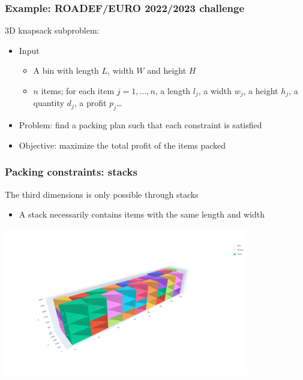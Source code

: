 \documentclass[10pt]{beamer}
\begin{document}
\begin{frame}
  \frametitle{Example: ROADEF/EURO 2022/2023 challenge}

  3D knapsack subproblem:
  \begin{itemize}
    \item Input
      \begin{itemize}
        \item A bin with length $L$, width $W$ and height $H$
        \item $n$ items; for each item $j = 1, \dots, n$, a length $l_j$, a width $w_j$, a height $h_j$, a quantity $d_j$, a profit $p_j$\dots
      \end{itemize}
    \item Problem: find a packing plan such that each constraint is satisfied
    \item Objective: maximize the total profit of the items packed
  \end{itemize}
\end{frame}

\begin{frame}
  \frametitle{Packing constraints: stacks}

  The third dimensions is only possible through stacks
  \begin{itemize}
    \item A stack necessarily contains items with the same length and width
  \end{itemize}

  \bigskip

  \begin{center}
    \includegraphics[trim=200 100 300 200,clip,width=0.8\textwidth]{img/packing.png}
  \end{center}
  
\end{frame}
\end{document}
